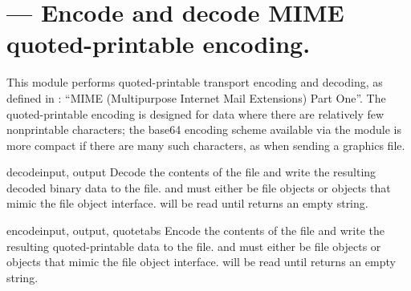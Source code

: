 \section{ ---
         Encode and decode MIME quoted-printable encoding.}



This module performs quoted-printable transport encoding and decoding,
as defined in : ``MIME (Multipurpose Internet Mail Extensions)
Part One''.  The quoted-printable encoding is designed for data where
there are relatively few nonprintable characters; the base64 encoding
scheme available via the  module is more compact if there
are many such characters, as when sending a graphics file.


\begin{funcdesc}{decode}{input, output}
Decode the contents of the  file and write the resulting
decoded binary data to the  file.
 and  must either be file objects or objects that
mimic the file object interface.  will be read until
 returns an empty string.
\end{funcdesc}

\begin{funcdesc}{encode}{input, output, quotetabs}
Encode the contents of the  file and write the resulting
quoted-printable data to the  file.
 and  must either be file objects or objects that
mimic the file object interface.  will be read until
 returns an empty string.
\end{funcdesc}



